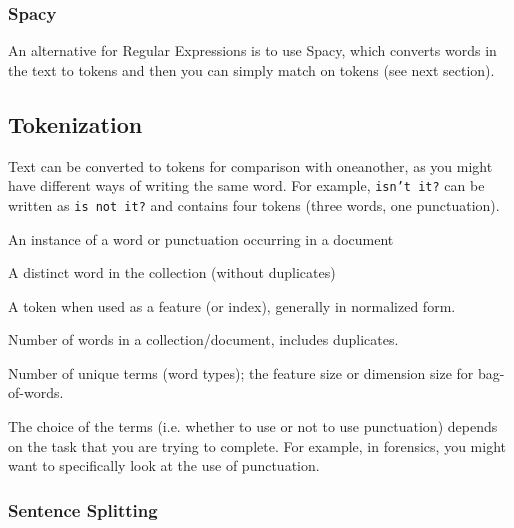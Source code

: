 \subsubsection{Spacy}

An alternative for Regular Expressions is to use Spacy, which converts words
in the text to tokens and then you can simply match on tokens (see
next section).

\subsection{Tokenization}

Text can be converted to tokens for comparison with oneanother, as you might
have different ways of writing the same word. For example,
\texttt{isn't it?} can
be written as \texttt{is not it?} and contains four tokens (three
words, one punctuation).

\begin{definition}[Token]
  An instance of a word or punctuation occurring in a document
\end{definition}

\begin{definition}
  A distinct word in the collection (without duplicates)
\end{definition}

\begin{definition}[Term]
  A token when used as a feature (or index), generally in normalized form.
\end{definition}

\begin{definition}
  Number of words in a collection/document, includes duplicates.
\end{definition}

\begin{definition}
  Number of unique terms (word types); the feature size or dimension
  size for bag-of-words.
\end{definition}

The choice of the terms (i.e. whether to use or not to use punctuation) depends
on the task that you are trying to complete. For example, in
forensics, you might
want to specifically look at the use of punctuation.

\subsubsection{Sentence Splitting}


